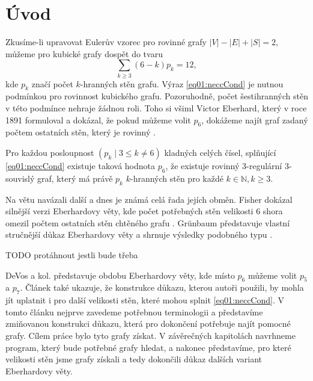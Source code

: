 \chapter*{Úvod}

Zkusíme-li upravovat Eulerův vzorec pro rovinné grafy
$|V|-|E|+|S|=2$, můžeme pro kubické grafy dospět do tvaru 
\begin{equation}\label{eq01:neccCond}
\sum_{k \geq 3}{(6-k)p_k}=12,
\end{equation}
kde $p_k$ značí počet $k$-hranných stěn grafu. Výraz \eqref{eq01:neccCond} je nutnou podmínkou pro rovinnost kubického grafu. Pozoruhodně, počet šestihranných stěn v této podmínce nehraje žádnou roli. Toho si všiml Victor Eberhard, který v roce 1891 formuloval a dokázal, že pokud můžeme volit $p_6$, dokážeme najít graf zadaný počtem ostatních stěn, který je rovinný \cite{Eberhard91}.

\begin{veta}\label{veta:Eberhard}
Pro každou posloupnost $(p_k \mid 3 \leq k \neq 6)$ kladných celých čísel, splňující \eqref{eq01:neccCond} existuje taková hodnota $p_6$, že existuje rovinný 3-regulární 3-souvislý graf, který má právě $p_k$ $k$-hranných stěn pro každé $k \in \mathbb{N}, k \geq 3 $.
\end{veta}

Na větu navázali další a dnes je známá celá řada jejích obměn. Fisher dokázal silnější verzi Eberhardovy věty, kde počet potřebných stěn velikosti 6 shora omezil počtem ostatních stěn chtěného grafu \citep{Fisher74}. Grünbaum představuje vlastní stručnější důkaz Eberhardovy věty a shrnuje výsledky podobného typu \citep{Grunbaum}. 

TODO protáhnout jestli bude třeba

DeVos a kol. \citep{Samal09} představuje obdobu Eberhardovy věty, kde místo $p_6$ můžeme volit $p_5$ a $p_7$. Článek také ukazuje, že konstrukce důkazu, kterou autoři použili, by mohla jít uplatnit i pro další velikosti stěn, které mohou splnit \eqref{eq01:neccCond}. V tomto článku nejprve zavedeme potřebnou terminologii a představíme zmiňovanou konstrukci důkazu, která pro dokončení potřebuje najít pomocné grafy. Cílem práce bylo tyto grafy získat. V závěrečných kapitolách navrhneme program, který bude potřebné grafy hledat, a nakonec představíme, pro které velikosti stěn jsme grafy získali a tedy dokončili důkaz dalších variant Eberhardovy věty.
